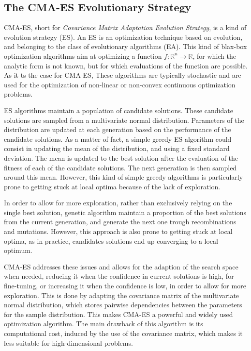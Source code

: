 \subsection{The CMA-ES Evolutionary Strategy}

CMA-ES, short for \textit{Covariance Matrix Adaptation Evolution Strategy}, is a kind of evolution strategy (ES). An ES is an optimization technique based on evolution, and
belonging to the class of evolutionary algorithms (EA).
This kind of blax-box optimization algorithms aim at optimizing a function $f : \mathds{R}^n \to \mathds{R}$, for which the analytic form is not known,
but for which evaluations of the function are possible. As it ts the case for CMA-ES, These algorithms are typically stochastic and are used for the optimization of
non-linear or non-convex continuous optimization problems.

ES algorithms maintain a population of candidate solutions. These candidate solutions are sampled from a multivariate normal distribution. Parameters of the distribution
are updated at each generation based on the performance of the candidate solutions. As a matter of fact, a simple greedy ES algorithm could consist in updating the
mean of the distribution, and using a fixed standard deviation. The mean is updated to the best solution after the evaluation of the fitness of each of the candidate
solutions. The next generation is then sampled around this mean. However, this kind of simple greedy algorithms is particularly prone to getting stuck at local optima because
of the lack of exploration.

In order to allow for more exploration, rather than exclusively relying on the single best solution, genetic algorithm maintain a proportion of the best solutions from
the current generation, and generate the next one trough recombinations and mutations. However, this approach is also prone to getting stuck at local optima, as in
practice, candidates solutions end up converging to a local optimum.

CMA-ES addresses these issues and allows for the adaption of the search space when needed, reducing it when the confidence in current solutions is high, for fine-tuning, or
increasing it when the confidence is low, in order to allow for more exploration. This is done by adapting the covariance matrix of the multivariate normal distribution,
which stores pairwise dependencies between the parameters for the sample distribution. This makes CMA-ES a powerful and widely used optimization algorithm. The main drawback
of this algorithm is its computational cost, induced by the use of the covariance matrix, which makes it less suitable for high-dimensional problems.

